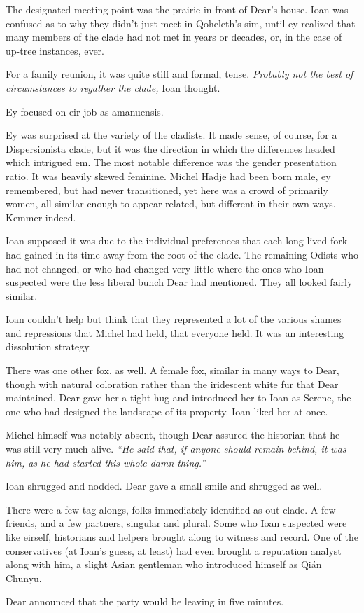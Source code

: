 The designated meeting point was the prairie in front of Dear's house. Ioan was confused as to why they didn't just meet in Qoheleth's sim, until ey realized that many members of the clade had not met in years or decades, or, in the case of up-tree instances, ever.

For a family reunion, it was quite stiff and formal, tense. \emph{Probably not the best of circumstances to regather the clade,} Ioan thought.

Ey focused on eir job as amanuensis.

Ey was surprised at the variety of the cladists. It made sense, of course, for a Dispersionista clade, but it was the direction in which the differences headed which intrigued em. The most notable difference was the gender presentation ratio. It was heavily skewed feminine. Michel Hadje had been born male, ey remembered, but had never transitioned, yet here was a crowd of primarily women, all similar enough to appear related, but different in their own ways. Kemmer indeed.

Ioan supposed it was due to the individual preferences that each long-lived fork had gained in its time away from the root of the clade. The remaining Odists who had not changed, or who had changed very little where the ones who Ioan suspected were the less liberal bunch Dear had mentioned. They all looked fairly similar.

Ioan couldn't help but think that they represented a lot of the various shames and repressions that Michel had held, that everyone held. It was an interesting dissolution strategy.

There was one other fox, as well. A female fox, similar in many ways to Dear, though with natural coloration rather than the iridescent white fur that Dear maintained. Dear gave her a tight hug and introduced her to Ioan as Serene, the one who had designed the landscape of its property. Ioan liked her at once.

Michel himself was notably absent, though Dear assured the historian that he was still very much alive. \emph{``He said that, if anyone should remain behind, it was him, as he had started this whole damn thing.''}

Ioan shrugged and nodded. Dear gave a small smile and shrugged as well.

There were a few tag-alongs, folks immediately identified as out-clade. A few friends, and a few partners, singular and plural. Some who Ioan suspected were like eirself, historians and helpers brought along to witness and record. One of the conservatives (at Ioan's guess, at least) had even brought a reputation analyst along with him, a slight Asian gentleman who introduced himself as Qián Chunyu.

Dear announced that the party would be leaving in five minutes.
